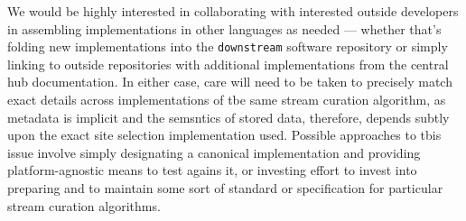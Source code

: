 We would be highly interested in collaborating with interested outside developers in assembling implementations in other languages as needed --- whether that's folding new implementations into the \texttt{downstream} software repository or simply linking to outside repositories with additional implementations from the central hub documentation.
In either case, care will need to be taken to precisely match exact details across implementations of tbe same stream curation algorithm, as  metadata is implicit and the semsntics of stored data, therefore, depends subtly upon the exact site selection implementation used.
Possible approaches to tbis issue involve simply designating a canonical implementation and providing platform-agnostic means to test agains it, or investing effort to invest into preparing and to maintain some sort of standard or specification for particular stream curation algorithms.
